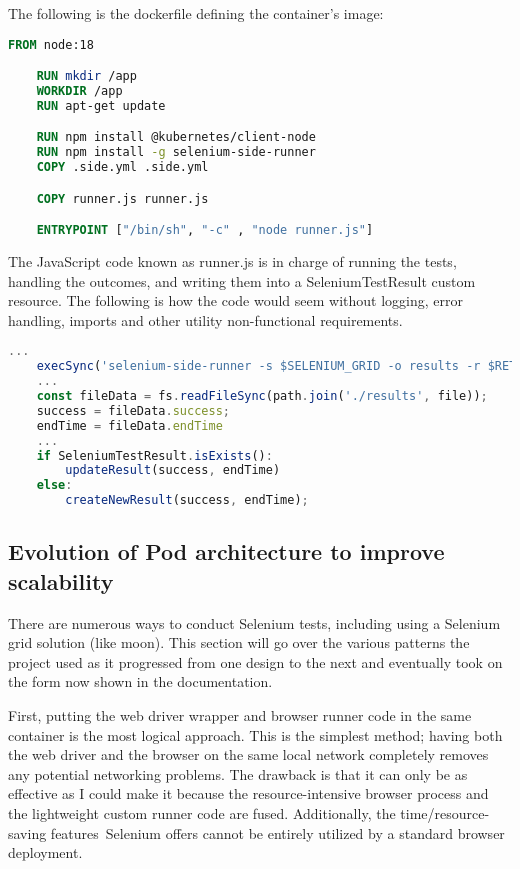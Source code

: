 The following is the dockerfile defining the container's image:
\begin{lstlisting}[language={Dockerfile}]
	FROM node:18

	RUN mkdir /app
	WORKDIR /app
	RUN apt-get update

	RUN npm install @kubernetes/client-node
	RUN npm install -g selenium-side-runner
	COPY .side.yml .side.yml

	COPY runner.js runner.js

	ENTRYPOINT ["/bin/sh", "-c" , "node runner.js"]
\end{lstlisting}

The JavaScript code known as runner.js is in charge of running the tests, handling the outcomes, and writing them into a SeleniumTestResult custom resource. The following is how the code would seem without logging, error handling, imports and other utility non-functional requirements.

\begin{lstlisting}[language={Javascript}]
	...
	execSync('selenium-side-runner -s $SELENIUM_GRID -o results -r $RETRIES /mnt/config/*.side');
	...
	const fileData = fs.readFileSync(path.join('./results', file));
	success = fileData.success;
    endTime = fileData.endTime
	...
	if SeleniumTestResult.isExists():
		updateResult(success, endTime)
	else:
		createNewResult(success, endTime);
\end{lstlisting}

\subsection{Evolution of Pod architecture to improve scalability}

There are numerous ways to conduct Selenium tests, including using a Selenium grid solution (like moon). This section will go over the various patterns the project used as it progressed from one design to the next and eventually took on the form now shown in the documentation.

First, putting the web driver wrapper and browser runner code in the same container is the most logical approach. This is the simplest method; having both the web driver and the browser on the same local network completely removes any potential networking problems. The drawback is that it can only be as effective as I could make it because the resource-intensive browser process and the lightweight custom runner code are fused. Additionally, the time/resource-saving features Selenium offers cannot be entirely utilized by a standard browser deployment.


